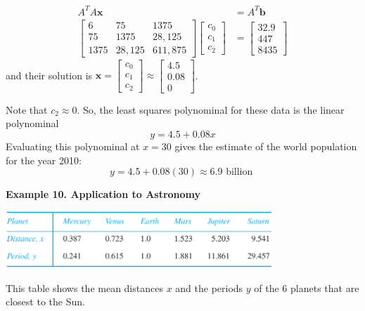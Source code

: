 \documentclass{article}
\newcommand\B{\textbf}
\begin{document}
    \begin{equation*}
        \begin{split}
            A^TA\B{x} &= A^T\B{b} \\
            \begin{bmatrix}
                6 & 75 & 1375 \\
                75 & 1375 & 28,125 \\
                1375 & 28,125 & 611,875
            \end{bmatrix}
            \begin{bmatrix}
                c_0 \\
                c_1 \\
                c_2
            \end{bmatrix} &= 
            \begin{bmatrix}
                32.9 \\
                447 \\
                8435
            \end{bmatrix}
        \end{split}
    \end{equation*}
    and their solution is $\B{x} = \begin{bmatrix}
        c_0 \\ c_1 \\ c_2
    \end{bmatrix} \approx \begin{bmatrix}
        4.5 \\
        0.08 \\
        0
    \end{bmatrix}$.

    Note that $c_2 \approx 0$. So, the least squares polynominal for these data is the linear polynominal 
    \[ y = 4.5 + 0.08x \]
    Evaluating this polynominal at $x = 30$ gives the estimate of the world population for the year 2010:
    \[y = 4.5 + 0.08(30) \approx 6.9 \text{ billion } \]

    \B{Example 10. \textcolor{blue5}{Application to Astronomy}}

    \begin{minipage}{0.615\linewidth}
        \includegraphics[width = 10cm]{images/planet1.png}
    \end{minipage}
    \begin{minipage}{0.32\linewidth}
        This table shows the mean distances $x$ and the periods $y$ of the 6 planets that are closest to the Sun.
    \end{minipage}
\end{document}
